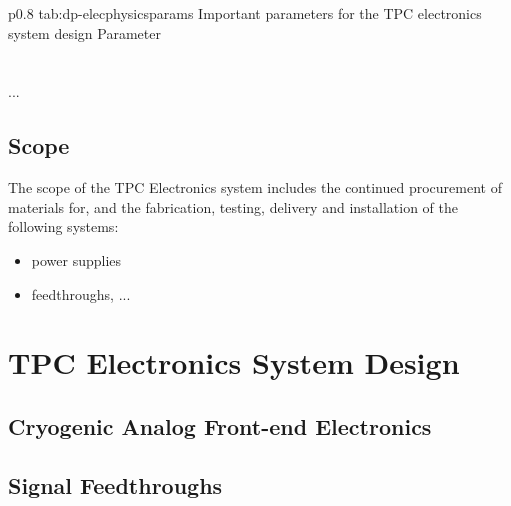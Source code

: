 \begin{dunetable}
{p{0.8\textwidth}}
{tab:dp-elecphysicsparams}
{Important parameters for the  TPC electronics system design}   
Parameter  \\ \toprowrule
  \\ \colhline
   \\ \colhline
 ...\\ 
\end{dunetable}



\subsection{Scope}
\label{sec:fddp-tpc-elec-scope}

The scope of the TPC Electronics system includes the continued procurement of materials for, and the fabrication, testing, delivery and installation of the following systems: 


\begin{itemize}
\item power supplies 
\item feedthroughs, ...
\end{itemize}



\section{TPC Electronics System Design}
\label{sec:fddp-tpc-elec-design}




\subsection{Cryogenic Analog Front-end Electronics}
\label{sec:fddp-tpc-elec-design-cryofe}

\subsection{Signal Feedthroughs}
\label{sec:fddp-tpc-elec-design-sft}


